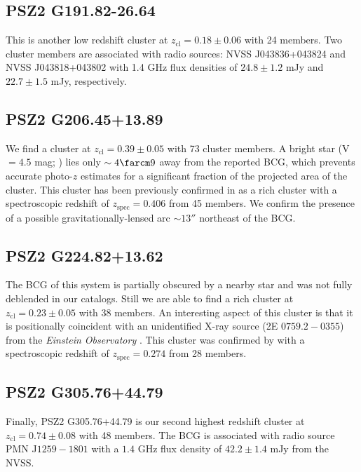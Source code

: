 \documentclass[apj, revtex4-1]{emulateapj}
\begin{document}

\subsection{PSZ2 G191.82-26.64} %
This is another low redshift cluster at $z_\mathrm{cl} = 0.18 \pm 0.06$ with 24 members. Two cluster members are associated with radio sources: NVSS J043836+043824 and NVSS J043818+043802 with 1.4 GHz flux densities of $24.8 \pm 1.2$ mJy and $22.7 \pm 1.5$ mJy, respectively.

\subsection{PSZ2 G206.45+13.89} %
We find a cluster at $z_\mathrm{cl} = 0.39 \pm 0.05$ with 73 cluster members. A bright star (V $= 4.5$ mag; \citealt{Hog2000}) lies only $\sim4\farcm9$ away from the reported BCG, which prevents accurate photo-$z$ estimates for a significant fraction of the projected area of the cluster. This cluster has been previously confirmed in \cite{Barrena2018} as a rich cluster with a spectroscopic redshift of $z_\mathrm{spec} = 0.406$ from 45 members. We confirm the presence of a possible gravitationally-lensed arc $\sim13''$ northeast of the BCG.

\subsection{PSZ2 G224.82+13.62} %
The BCG of this system is partially obscured by a nearby star and was not fully deblended in our catalogs. Still we are able to find a rich cluster at $z_\mathrm{cl} = 0.23 \pm 0.05$ with 38 members. An interesting aspect of this cluster is that it is positionally coincident with an unidentified X-ray source (2E $0759.2-0355$) from the \textit{Einstein Observatory} \citep{Harris1990}. This cluster was confirmed by \cite{Barrena2018} with a spectroscopic redshift of $z_\mathrm{spec} = 0.274$ from 28 members.

\subsection{PSZ2 G305.76+44.79} %
Finally, PSZ2 G305.76+44.79 is our second highest redshift cluster at $z_\mathrm{cl} = 0.74 \pm 0.08$ with 48 members. The BCG is associated with radio source PMN J$1259-1801$ with a $1.4$ GHz flux density of $42.2\pm 1.4$ mJy from the NVSS.
\end{document}
